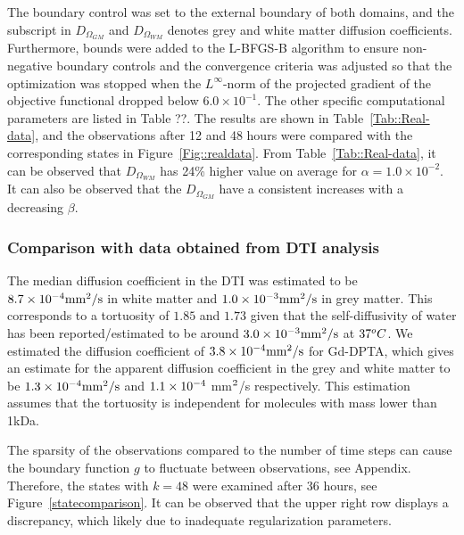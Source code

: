 \documentclass[12pt,a4paper]{article}
\def\mm2s{mm$\sp{2}$/s}
\begin{document}

The boundary control was set to the external boundary of both domains, and the subscript in $D_{\Omega_{GM}}$ and $D_{\Omega_{WM}}$ denotes grey and white matter diffusion coefficients. Furthermore, bounds were added to the L-BFGS-B algorithm to ensure non-negative boundary controls and the convergence criteria was adjusted so that the optimization was stopped when the $L^\infty$-norm of the projected gradient of the objective functional dropped below $6.0\times 10^{-1}$. The other specific  computational parameters are listed in Table ??.
The results are shown in Table~\ref{Tab::Real-data}, and the observations after 12 and 48 hours were compared with the corresponding states in Figure~\ref{Fig::realdata}. From Table~\ref{Tab::Real-data}, it can be observed that $D_{\Omega_{WM}}$ has 24\% higher value on average for $\alpha =1.0\times 10^{-2}$. It can also be observed that the $D_{\Omega_{GM}}$ have a consistent increases with a decreasing $\beta$.

\subsubsection{Comparison with data obtained from DTI analysis}
The median diffusion coefficient in the DTI was estimated to be 
$8.7\times 10\sp{-4} \mathrm{mm\sp{2}/s}$ 
in white matter and 
$1.0\times 10\sp{-3} \mathrm{mm\sp{2}/s}$ 
in grey matter. This corresponds to a tortuosity of $1.85$ and $1.73$ given that the self-diffusivity of water has been reported/estimated to be around $3.0\times 10\sp{-3}\mathrm{mm\sp{2}/s}$ at $37\sp{o}C$. We estimated the diffusion coefficient of $3.8\times 10\sp{-4} \mathrm{mm\sp{2}/s}$ for Gd-DPTA, which gives an estimate for the apparent diffusion coefficient in the grey and white matter to be $ 1.3\times 10\sp{-4}\mathrm{mm\sp{2}/s}$ and $1.1\times 10\sp{-4}$ \mm2s respectively. This estimation assumes that the tortuosity is independent for molecules with mass lower than 1kDa. 

The sparsity of the observations compared to the number of time steps can cause the boundary function $g$ to fluctuate between observations, see Appendix. Therefore, the states with $k=48$ were examined after 36 hours, see Figure~\ref{statecomparison}. It can be observed that the upper right row displays a discrepancy, which likely due to inadequate regularization parameters. 
\end{document}
